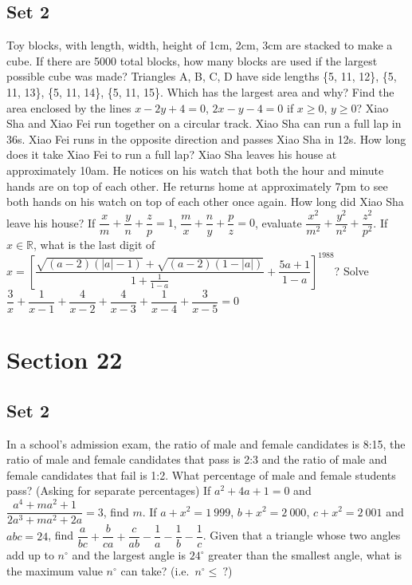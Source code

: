 \documentclass[11pt,a4paper,twoside,UTF8]{exam}
\begin{document}
\subsection*{Set 2}
\begin{questions}
	\question
	Toy blocks, with length, width, height of 1cm, 2cm, 3cm are stacked to make a cube. If there are 5000 total blocks, how many blocks are used if the largest possible cube was made?
	\question
	Triangles A, B, C, D have side lengths \{5, 11, 12\}, \{5, 11, 13\}, \{5, 11, 14\}, \{5, 11, 15\}. Which has the largest area and why?
	\question
	Find the area enclosed by the lines $x - 2y + 4 = 0$, $2x - y - 4 = 0$ if $x \geq 0$, $y \geq 0$?
	\question
	Xiao Sha and Xiao Fei run together on a circular track. Xiao Sha can run a full lap in 36s. Xiao Fei runs in the opposite direction and passes Xiao Sha in 12s. How long does it take Xiao Fei to run a full lap?
	\question
	Xiao Sha leaves his house at approximately 10am. He notices on his watch that both the hour and minute hands are on top of each other. He returns home at approximately 7pm to see both hands on his watch on top of each other once again. How long did Xiao Sha leave his house?
	\setcounter{question}{8}
	\question
	If $\dfrac{x}{m} + \dfrac{y}{n} + \dfrac{z}{p} = 1$, $\dfrac{m}{x} + \dfrac{n}{y} + \dfrac{p}{z} = 0$, evaluate $\dfrac{x^2}{m^2} + \dfrac{y^2}{n^2} + \dfrac{z^2}{p^2}$.
	\setcounter{question}{12}
	\question
	If $x \in \mathbb{R}$, what is the last digit of $x = \left[\dfrac{\sqrt{(a - 2)(|a| - 1)} + \sqrt{(a - 2)(1 - |a|)}}{1 + \frac{1}{1 - a}} + \dfrac{5a + 1}{1 - a}\right]^{1988}$?
	\question
	Solve $\dfrac{3}{x} + \dfrac{1}{x - 1} + \dfrac{4}{x - 2} + \dfrac{4}{x - 3} + \dfrac{1}{x - 4} + \dfrac{3}{x - 5} = 0$
\end{questions}
\section*{Section 22}
\subsection*{Set 2}
\begin{questions}
	\setcounter{question}{1}
	\question
	In a school's admission exam, the ratio of male and female candidates is 8:15, the ratio of male and female candidates that pass is 2:3 and the ratio of male and female candidates that fail is 1:2. What percentage of male and female students pass? (Asking for separate percentages)
	\setcounter{question}{7}
	\question
	If $a^2 + 4a + 1 = 0$ and $\dfrac{a^4 + ma^2 + 1}{2a^3 + ma^2 + 2a} = 3$, find $m$.
	\setcounter{question}{9}
	\question
	If $a + x^2 = 1\ 999$, $b + x^2 = 2\ 000$, $c+ x^2 = 2\ 001$ and $abc = 24$, find $\dfrac{a}{bc} + \dfrac{b}{ca} + \dfrac{c}{ab} - \dfrac{1}{a} - \dfrac{1}{b} - \dfrac{1}{c}$.
	\setcounter{question}{9}
	\question
	Given that a triangle whose two angles add up to $n^\circ$ and the largest angle is $24^\circ$ greater than the smallest angle, what is the maximum value $n^\circ$ can take? (i.e.\ $n^\circ \leq\ ?$)
\end{questions}
\end{document}
